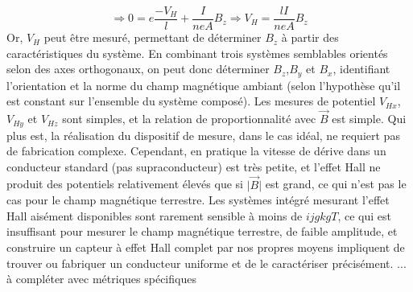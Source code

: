\documentclass{standalone}
\begin{document}
\begin{equation*}
\Rightarrow 0=e\frac{-V_H}{l}+\frac{I}{neA}B_z \Rightarrow V_H = \frac{lI}{neA}B_z
\end{equation*}
Or, $V_H$ peut être mesuré, permettant de déterminer $B_z$ à partir des caractéristiques du système.
En combinant trois systèmes semblables orientés selon des axes orthogonaux, on peut donc déterminer $B_z$,$B_y$ et $B_x$, identifiant l'orientation et la norme du champ magnétique ambiant (selon l'hypothèse qu'il est constant sur l'ensemble du système composé). Les mesures de potentiel $V_{Hx}$, $V_{Hy}$ et $V_{Hz}$ sont simples, et la relation de proportionnalité avec $\vec{B}$ est simple. Qui plus est, la réalisation du dispositif de mesure, dans le cas idéal, ne requiert pas de fabrication complexe.
Cependant, en pratique la vitesse de dérive dans un conducteur standard (pas supraconducteur) est très petite, et l'effet Hall ne produit des potentiels relativement élevés que si $\vert\vec{B}\vert$ est grand, ce qui n'est pas le cas pour le champ magnétique terrestre. Les systèmes intégré mesurant l'effet Hall aisément disponibles sont rarement sensible à moins de $ijgkg \textit{T}$, ce qui est insuffisant pour mesurer le champ magnétique terrestre, de faible amplitude, et construire un capteur à effet Hall complet par nos propres moyens impliquent de trouver ou fabriquer un conducteur uniforme et de le caractériser précisément. ... à compléter avec métriques spécifiques
\end{document}
